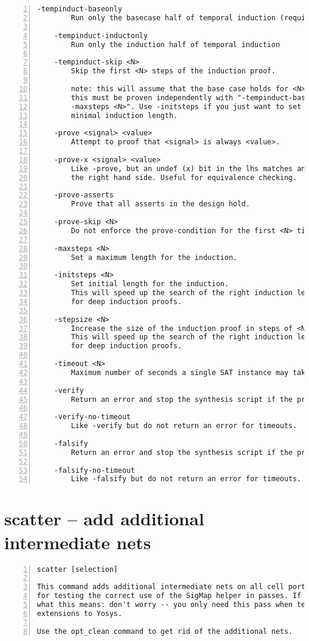 \begin{lstlisting}[numbers=left,frame=single]
    -tempinduct-baseonly
        Run only the basecase half of temporal induction (requires -maxsteps)

    -tempinduct-inductonly
        Run only the induction half of temporal induction

    -tempinduct-skip <N>
        Skip the first <N> steps of the induction proof.

        note: this will assume that the base case holds for <N> steps.
        this must be proven independently with "-tempinduct-baseonly
        -maxsteps <N>". Use -initsteps if you just want to set a
        minimal induction length.

    -prove <signal> <value>
        Attempt to proof that <signal> is always <value>.

    -prove-x <signal> <value>
        Like -prove, but an undef (x) bit in the lhs matches any value on
        the right hand side. Useful for equivalence checking.

    -prove-asserts
        Prove that all asserts in the design hold.

    -prove-skip <N>
        Do not enforce the prove-condition for the first <N> time steps.

    -maxsteps <N>
        Set a maximum length for the induction.

    -initsteps <N>
        Set initial length for the induction.
        This will speed up the search of the right induction length
        for deep induction proofs.

    -stepsize <N>
        Increase the size of the induction proof in steps of <N>.
        This will speed up the search of the right induction length
        for deep induction proofs.

    -timeout <N>
        Maximum number of seconds a single SAT instance may take.

    -verify
        Return an error and stop the synthesis script if the proof fails.

    -verify-no-timeout
        Like -verify but do not return an error for timeouts.

    -falsify
        Return an error and stop the synthesis script if the proof succeeds.

    -falsify-no-timeout
        Like -falsify but do not return an error for timeouts.
\end{lstlisting}

\section{scatter -- add additional intermediate nets}
\label{cmd:scatter}
\begin{lstlisting}[numbers=left,frame=single]
    scatter [selection]

This command adds additional intermediate nets on all cell ports. This is used
for testing the correct use of the SigMap helper in passes. If you don't know
what this means: don't worry -- you only need this pass when testing your own
extensions to Yosys.

Use the opt_clean command to get rid of the additional nets.
\end{lstlisting}

